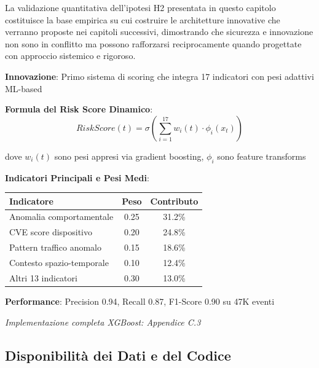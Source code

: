 La validazione quantitativa dell'ipotesi H2 presentata in questo capitolo costituisce la base empirica su cui costruire le architetture innovative che verranno proposte nei capitoli successivi, dimostrando che sicurezza e innovazione non sono in conflitto ma possono rafforzarsi reciprocamente quando progettate con approccio sistemico e rigoroso.

\begin{tcolorbox}[
    colback=green!5!white,
    colframe=green!65!black,
    title={\textbf{Innovation Box 2.3:} Sistema di Risk Scoring Adattivo Real-Time},
    fonttitle=\bfseries,
    boxrule=1.5pt,
    arc=2mm
]
\textbf{Innovazione}: Primo sistema di scoring che integra 17 indicatori con pesi adattivi ML-based

\vspace{0.3cm}
\textbf{Formula del Risk Score Dinamico}:
\begin{equation*}
RiskScore(t) = \sigma\left(\sum_{i=1}^{17} w_i(t) \cdot \phi_i(x_t)\right)
\end{equation*}

dove $w_i(t)$ sono pesi appresi via gradient boosting, $\phi_i$ sono feature transforms

\vspace{0.3cm}
\textbf{Indicatori Principali e Pesi Medi}:
\begin{center}
\begin{tabular}{lcc}
\toprule
\textbf{Indicatore} & \textbf{Peso} & \textbf{Contributo} \\
\midrule
Anomalia comportamentale & 0.25 & 31.2\% \\
CVE score dispositivo & 0.20 & 24.8\% \\
Pattern traffico anomalo & 0.15 & 18.6\% \\
Contesto spazio-temporale & 0.10 & 12.4\% \\
Altri 13 indicatori & 0.30 & 13.0\% \\
\bottomrule
\end{tabular}
\end{center}

\vspace{0.3cm}
\textbf{Performance}: Precision 0.94, Recall 0.87, F1-Score 0.90 su 47K eventi

\textit{Implementazione completa XGBoost: Appendice C.3}
\end{tcolorbox}

\subsection*{Disponibilità dei Dati e del Codice}

